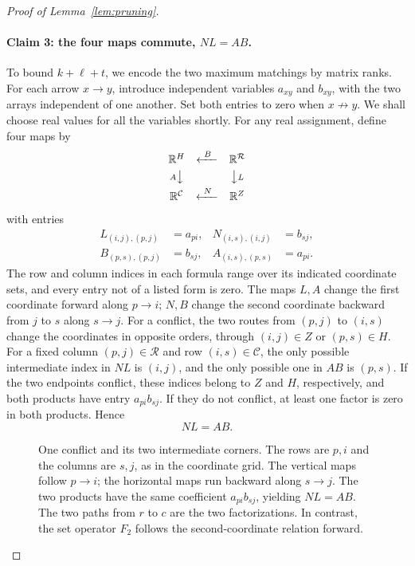 \begin{proof}[Proof of Lemma~\ref{lem:pruning}]
\paragraph{Claim 3: the four maps commute, $NL=AB$.}
To bound $k+\ell+t$, we encode the two maximum matchings by matrix ranks.
For each arrow $x\to y$, introduce independent variables $a_{xy}$ and
$b_{xy}$, with the two arrays independent of one another.  Set both
entries to zero when $x\not\to y$.  We shall choose real values for all
the variables shortly.  For any real assignment, define four maps by
\[
 \begin{array}{ccc}
 \mathbb R^H&\xleftarrow{\ B\ }&\mathbb R^{\mathcal R}\\[3pt]
 {\scriptstyle A}\big\downarrow&&\big\downarrow{\scriptstyle L}\\[3pt]
 \mathbb R^{\mathcal C}&\xleftarrow{\ N\ }&\mathbb R^Z
 \end{array}
\]
with entries
\begin{equation}\label{eq:pruning-maps}
 \begin{aligned}
 L_{(i,j),(p,j)}&=a_{pi},&
 N_{(i,s),(i,j)}&=b_{sj},\\
 B_{(p,s),(p,j)}&=b_{sj},&
 A_{(i,s),(p,s)}&=a_{pi}.
 \end{aligned}
\end{equation}
The row and column indices in each formula range over its indicated
coordinate sets, and every entry not of a listed form is zero.
The maps $L,A$ change the first coordinate forward along $p\to i$;
$N,B$ change the second coordinate backward from $j$ to $s$ along $s\to j$.
For a conflict, the two routes from $(p,j)$ to $(i,s)$ change the
coordinates in opposite orders, through $(i,j)\in Z$ or $(p,s)\in H$.
For a fixed column $(p,j)\in\mathcal R$ and row
$(i,s)\in\mathcal C$, the only possible intermediate index in $NL$ is
$(i,j)$, and the only possible one in $AB$ is $(p,s)$.  If the two
endpoints conflict, these indices belong to $Z$ and $H$, respectively,
and both products have entry $a_{pi}b_{sj}$.  If they do not conflict,
at least one factor is zero in both products.  Hence
\begin{equation}\label{eq:pruning-commute}
 NL=AB.
\end{equation}


\begin{figure}[ht]\centering
\caption{One conflict and its two intermediate corners. The rows are $p,i$ and the columns are $s,j$, as in the coordinate grid. The vertical maps follow $p\to i$; the horizontal maps run backward along $s\to j$. The two products have the same coefficient $a_{pi}b_{sj}$, yielding $NL=AB$. The two paths from $r$ to $c$ are the two factorizations. In contrast, the set operator $F_2$ follows the second-coordinate relation forward.}
\end{figure}


\end{proof}
